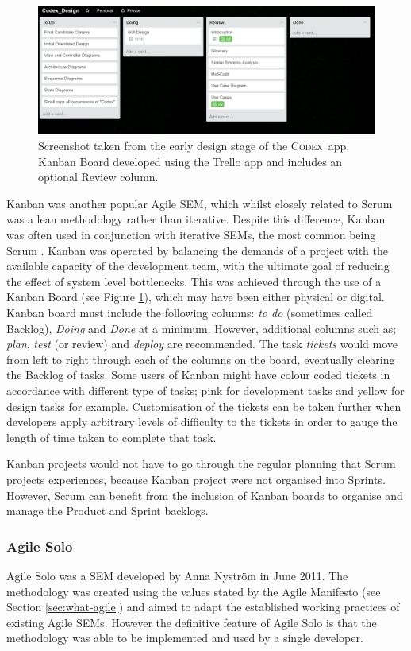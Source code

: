 \documentclass[final]{cmpreport}
\newcommand{\Codex}{\textsc{Codex}}
\begin{document}
			\begin{figure}
				\centering
				\includegraphics[width=0.8\linewidth]{trello_board.png}
				\caption[Example Kanban Board using Trello]{Screenshot taken from the early design stage of the \Codex \ app. Kanban Board developed using the Trello app \citep{trello} and includes an optional Review column.} \label{fig:kanban}
			\end{figure}
		
			Kanban was another popular Agile SEM, which whilst closely related to Scrum was a lean methodology rather than iterative. Despite this difference, Kanban was often used in conjunction with iterative SEMs, the most common being Scrum \citep{kanban}. Kanban was operated by balancing the demands of a project with the available capacity of the development team, with the ultimate goal of reducing the effect of system level bottlenecks. This was achieved through the use of a Kanban Board (see Figure \ref{fig:kanban}), which may have been either physical or digital. Kanban board must include the following columns: \emph{to do} (sometimes called Backlog), \emph{Doing} and \emph{Done} at a minimum. However, additional columns such as; \emph{plan}, \emph{test} (or review) and \emph{deploy} are recommended. The task \emph{tickets} would move from left to right through each of the columns on the board, eventually clearing the Backlog of tasks. Some users of Kanban might have colour coded tickets in accordance with different type of tasks; pink for development tasks and yellow for design tasks for example. Customisation of the tickets can be taken further when developers apply arbitrary levels of difficulty to the tickets in order to gauge the length of time taken to complete that task. 
			
			Kanban projects would not have to go through the regular planning that Scrum projects experiences, because Kanban project were not organised into Sprints. However, Scrum can benefit from the inclusion of Kanban boards to organise and manage the Product and Sprint backlogs.
			
			\subsubsection{Agile Solo} \label{sec:agile-solo}
			Agile Solo was a SEM developed by Anna Nystr{\"o}m in June 2011. The methodology was created using the values stated by the Agile Manifesto (see Section \ref{sec:what-agile}) and aimed to adapt the established working practices of existing Agile SEMs. However the definitive feature of Agile Solo is that the methodology was able to be implemented and used by a single developer. 
			
\end{document}
